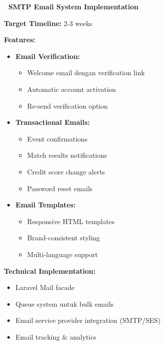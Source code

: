 \documentclass[12pt,a4paper]{article}
\begin{document}
\begin{planned}
\textbf{🔄 SMTP Email System Implementation}

\textbf{Target Timeline:} 2-3 weeks

\textbf{Features:}
\begin{itemize}
    \item \textbf{Email Verification:}
    \begin{itemize}
        \item Welcome email dengan verification link
        \item Automatic account activation
        \item Re-send verification option
    \end{itemize}
    \item \textbf{Transactional Emails:}
    \begin{itemize}
        \item Event confirmations
        \item Match results notifications
        \item Credit score change alerts
        \item Password reset emails
    \end{itemize}
    \item \textbf{Email Templates:}
    \begin{itemize}
        \item Responsive HTML templates
        \item Brand-consistent styling
        \item Multi-language support
    \end{itemize}
\end{itemize}

\textbf{Technical Implementation:}
\begin{itemize}
    \item Laravel Mail facade
    \item Queue system untuk bulk emails
    \item Email service provider integration (SMTP/SES)
    \item Email tracking \& analytics
\end{itemize}
\end{planned}
\end{document}
